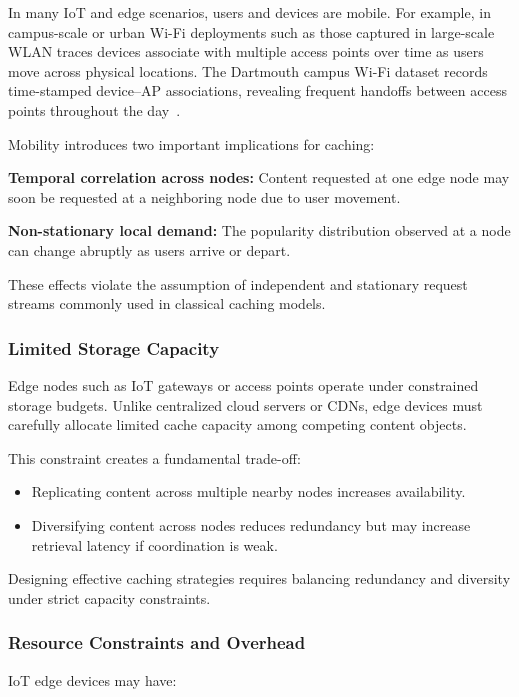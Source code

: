 In many IoT and edge scenarios, users and devices are mobile. For example, in campus-scale or urban Wi-Fi deployments such as those captured in large-scale WLAN traces devices associate with multiple access points over time as users move across physical locations. The Dartmouth campus Wi-Fi dataset records time-stamped device–AP associations, revealing frequent handoffs between access points throughout the day~\cite{Kotz2004Dartmouth}.

Mobility introduces two important implications for caching:

\textbf{Temporal correlation across nodes:}  
Content requested at one edge node may soon be requested at a neighboring node due to user movement.

\textbf{Non-stationary local demand:}  
The popularity distribution observed at a node can change abruptly as users arrive or depart.

These effects violate the assumption of independent and stationary request streams commonly used in classical caching models.

\subsubsection{Limited Storage Capacity}

Edge nodes such as IoT gateways or access points operate under constrained storage budgets. Unlike centralized cloud servers or CDNs, edge devices must carefully allocate limited cache capacity among competing content objects.

This constraint creates a fundamental trade-off:

\begin{itemize}
    \item Replicating content across multiple nearby nodes increases availability.
    \item Diversifying content across nodes reduces redundancy but may increase retrieval latency if coordination is weak.
\end{itemize}

Designing effective caching strategies requires balancing redundancy and diversity under strict capacity constraints.

\subsubsection{Resource Constraints and Overhead}

IoT edge devices may have:

